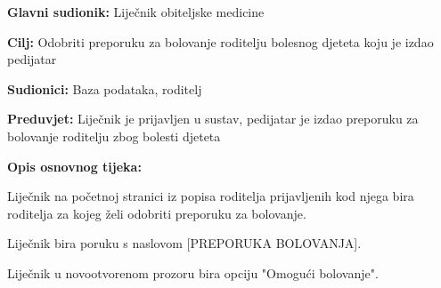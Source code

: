 					
					
					\noindent {}
					\begin{packed_item}
						
						\item \textbf{Glavni sudionik: }Liječnik obiteljske medicine
						\item  \textbf{Cilj:} Odobriti preporuku za bolovanje roditelju bolesnog djeteta koju je izdao pedijatar
						\item  \textbf{Sudionici:} Baza podataka, roditelj
						\item  \textbf{Preduvjet:} Liječnik je prijavljen u sustav, pedijatar je izdao preporuku za bolovanje roditelju zbog bolesti djeteta
						\item  \textbf{Opis osnovnog tijeka:}
						
						\item[] \begin{packed_enum}
							
							\item Liječnik na početnoj stranici iz popisa roditelja prijavljenih kod njega bira roditelja za kojeg želi odobriti preporuku za bolovanje.
							\item Liječnik bira poruku s naslovom [PREPORUKA BOLOVANJA].
							\item Liječnik u novootvorenom prozoru bira opciju "Omogući bolovanje".
						\end{packed_enum}
						
						
						
					\end{packed_item}
					
